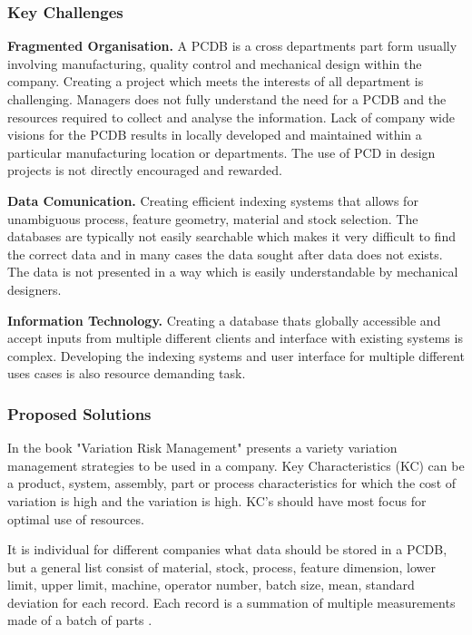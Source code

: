 \documentclass[aip,amsmath, preprint, author-year]{revtex4-1}
\begin{document}
\subsubsection{Key Challenges}
\textbf{Fragmented Organisation.}  A PCDB is a cross departments part form usually involving manufacturing, quality control and mechanical design within the company. 
Creating a project which meets the interests of all department is challenging. 
Managers does not fully understand the need for a PCDB and the resources required to collect and analyse the information. 
Lack of company wide visions for the PCDB results in locally developed and maintained within a particular manufacturing location or departments. 
The use of PCD in design projects is not directly encouraged and rewarded. 

\textbf{Data Comunication.} Creating efficient indexing systems that allows for unambiguous process, feature geometry, material and stock selection. 
The databases are typically not easily searchable which makes it very difficult to find the correct data and in many cases the data sought after data does not exists. 
The data is not presented in a way which is easily understandable by mechanical designers.

\textbf{Information Technology.} Creating a database thats globally accessible and accept inputs from multiple different clients and interface with existing systems is complex.
Developing the indexing systems and user interface for multiple different uses cases is also resource demanding task.  

\subsubsection{Proposed Solutions}
In the book "Variation Risk Management" \cite{thornton2004variation} presents a variety variation management strategies to be used in a company. 
Key Characteristics (KC) can be a product, system, assembly, part or process characteristics for which the cost of variation is high and the variation is high. 
KC's should have most focus for optimal use of resources. 

It is individual for different companies what data should be stored in a PCDB, but a general list consist of material, stock, process, feature dimension, lower limit, upper limit, machine, operator number, batch size, mean, standard deviation for each record. 
Each record is a summation of multiple measurements made of a batch of parts \citep{thornton2004variation}.
\end{document}
